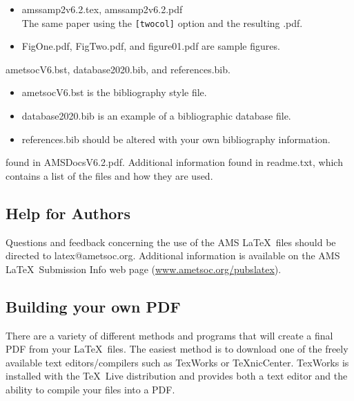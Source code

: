\documentclass{ametsocV6.2}
\begin{document}
\begin{description}
\begin{itemize}
\item
amssamp2v6.2.tex, amssamp2v6.2.pdf \\
The same paper using the \verb+[twocol]+ option and the resulting .pdf.

\item
FigOne.pdf, FigTwo.pdf, and figure01.pdf are sample figures.


\end{itemize}

\item[Bibliography Files:]

ametsocV6.bst, database2020.bib, and references.bib.  

\begin{itemize}
\item
ametsocV6.bst is the bibliography style file. 

\item
database2020.bib is an example of a bibliographic database file.

\item
references.bib should be altered with your own bibliography information.  
\end{itemize}



\item[Documention:] found in AMSDocsV6.2.pdf. Additional information
found in
readme.txt, which contains a list of the files and how they are used.

\end{description}

\subsection{Help for Authors}
Questions and feedback concerning the use of the AMS \LaTeX\ files should be
directed to latex@ametsoc.org. Additional information is available on the AMS
\LaTeX\ Submission Info web page (\url{www.ametsoc.org/pubslatex}).



\appendix[C]

\subsection{Building your own PDF}
There are a variety of different methods and programs that will create a
final PDF from your \LaTeX\ files. The easiest method is to download one of
the freely available text editors/compilers such as TexWorks or TeXnicCenter.
TexWorks is installed with the  \TeX\ Live distribution and provides both a text
editor and the ability to compile your files into a PDF.
\end{document}
